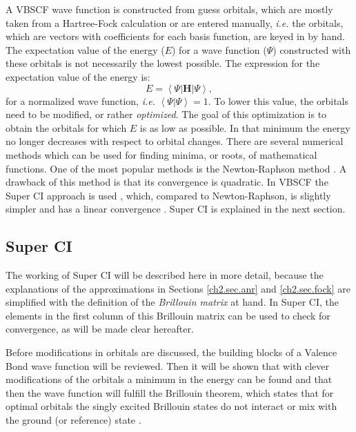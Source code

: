 A VBSCF wave function is constructed from guess orbitals, which are mostly taken from a Hartree-Fock calculation or are entered manually, \textit{i.e.} the orbitals, which are vectors with coefficients for each basis function, are keyed in by hand. The expectation value of the energy ($E$) for a wave function ($\Psi$) constructed with these orbitals is not necessarily the lowest possible. The expression for the expectation value of the energy is:
\begin{equation}
E = \left < \Psi | \mathbf{H} | \Psi \right >,
\label{ch2.eq.expenerg}
\end{equation}
for a normalized wave function, \textit{i.e.} $\left < \Psi | \Psi \right > = 1$. To lower this value, the orbitals need to be modified, or rather \textit{optimized}. The goal of this optimization is to obtain the orbitals for which $E$ is as low as possible. In that minimum the energy no longer decreases with respect to orbital changes. There are several numerical methods which can be used for finding minima, or roots, of mathematical functions. One of the most popular methods is the Newton-Raphson method \cite{numerical}. A drawback of this method is that its convergence is quadratic. In VBSCF the Super CI approach is used \cite{superci1,superci2}, which, compared to Newton-Raphson, is slightly simpler and has a linear convergence \cite{koos1}. Super CI is explained in the next section.

\subsection{Super CI}

The working of Super CI will be described here in more detail, because the explanations of the approximations in Sections \ref{ch2.sec.anr} and \ref{ch2.sec.fock} are simplified with the definition of the \textit{Brillouin matrix} at hand. In Super CI, the elements in the first column of this Brillouin matrix can be used to check for convergence, as will be made clear hereafter. 

Before modifications in orbitals are discussed, the building blocks of a Valence Bond wave function will be reviewed. Then it will be shown that with clever modifications of the orbitals a minimum in the energy can be found and that then the wave function will fulfill the Brillouin theorem, which states that for optimal orbitals the singly excited Brillouin states do not interact or mix with the ground (or reference) state \cite{brillouin}.

